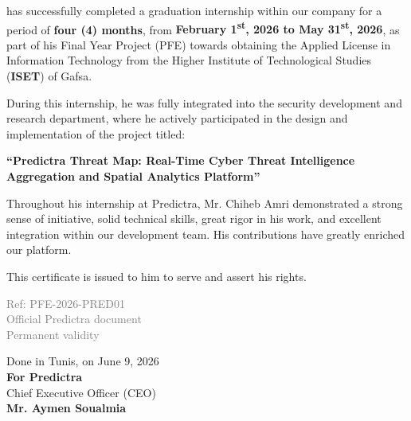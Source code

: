 \documentclass[12pt,a4paper]{article}
\begin{document}
\noindent has successfully completed a graduation internship within our company for a period of \textbf{four (4) months}, from \textbf{February 1\textsuperscript{st}, 2026 to May 31\textsuperscript{st}, 2026}, as part of his Final Year Project (PFE) towards obtaining the Applied License in Information Technology from the Higher Institute of Technological Studies (\textbf{ISET}) of Gafsa.

\vspace{0.25cm}
\noindent During this internship, he was fully integrated into the security development and research department, where he actively participated in the design and implementation of the project titled:

\vspace{0.25cm}
\begin{center}
    \textbf{\textcolor{cyberblue}{``Predictra Threat Map: Real-Time Cyber Threat Intelligence\\ Aggregation and Spatial Analytics Platform''}}
\end{center}

\vspace{0.25cm}
\noindent Throughout his internship at Predictra, Mr. Chiheb Amri demonstrated a strong sense of initiative, solid technical skills, great rigor in his work, and excellent integration within our development team. His contributions have greatly enriched our platform.

\vspace{0.25cm}
\noindent This certificate is issued to him to serve and assert his rights.

\vspace{0.3cm}

\noindent
\begin{minipage}[t]{0.40\textwidth}
    \begin{flushleft}
        \textcolor{gray}{\scriptsize Ref: PFE-2026-PRED01}\\
        \textcolor{gray}{\scriptsize Official Predictra document}\\
        \textcolor{gray}{\scriptsize Permanent validity}
    \end{flushleft}
\end{minipage}
\hfill
\begin{minipage}[t]{0.55\textwidth}
    \begin{flushright}
        Done in Tunis, on June 9, 2026 \\[0.15cm]
        \textbf{For Predictra} \\
        Chief Executive Officer (CEO) \\[1.8cm]
        \textbf{Mr. Aymen Soualmia}
    \end{flushright}
\end{minipage}
\end{document}
